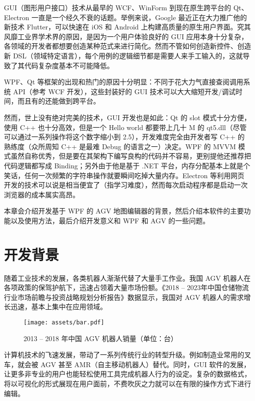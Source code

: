 
GUI（图形用户接口）技术从最早的 WCF、WinForm 到现在原生跨平台的 Qt、Electron 一直是一个经久不衰的话题。举例来说，Google 最近正在大力推广他的新技术 Flutter，可以快速在 iOS 和 Android 上构建高质量的原生用户界面。究其风靡工业界学术界的原因，是因为一个用户体验良好的 GUI 应用本身十分复杂，各领域的开发者都想要创造某种范式\cite{url:uiArchs}来进行简化。然而不管如何创造新控件、创造新 DSL（领域特定语言），每个用例的逻辑细节都是需要人来手工输入的，这就导致了其代码复杂度基本不可能降低。

WPF、Qt 等框架的出现和热门的原因十分明显：不同于花大力气直接查阅调用系统 API（参考 WCF 开发），这些封装好的 GUI 技术可以大大缩短开发/调试时间，而且有的还能做到跨平台。

然而，世上没有绝对完美的技术，GUI 开发也是如此：Qt 的 slot 模式十分方便，使用 C++ 也十分高效，但是一个 Hello world 都要带上几十 M 的 qt5.dll（尽管可以通过一系列操作将这个数字缩小到 2.5），开发难度完全由开发者写 C++ 的熟练度（众所周知 C++ 是最难 Debug 的语言之一）决定。WPF 的 MVVM 模式虽然自称优秀，但是要在其架构下编写良构的代码并不容易，更别提他还推荐把代码逻辑都写成 Binding；另外由于他是基于 .NET 平台，内存分配基本上就是个笑话，任何一次频繁的字符串操作就要瞬间吃掉大量内存。Electron 等利用网页开发的技术可以说是相当便宜了（指学习难度），然而每次启动程序都是启动一次浏览器的成本属实高昂。

本章会介绍开发基于 WPF 的 AGV 地图编辑器的背景，然后介绍本软件的主要功能以及使用方法，最后介绍开发意义和 WPF 和 AGV 的一些问题。

\section{开发背景}

随着工业技术的发展，各类机器人渐渐代替了大量手工作业。我国 AGV 机器人在各项政策的保驾护航下，迅速占领着大量市场份额。《2018 -- 2023年中国仓储物流行业市场前瞻与投资战略规划分析报告》数据\cite{url:20180131C02LR0}显示，我国对 AGV 机器人的需求增长迅速，基本上集中在应用领域。

\begin{figure}[H]
  \centering
  \texttt{[image: assets/bar.pdf]}
  \caption{2013 -- 2018 年中国 AGV 机器人销量（单位：台）}
  \label{fig:bar}
\end{figure}

计算机技术的飞速发展，带动了一系列传统行业的转型升级。例如制造业常用的叉车，就会被 AGV 甚至 AMR（自主移动机器人）替代。同时，GUI 软件的发展，让更多非专业的用户也能轻松使用工具完成机器人行为的设定。复杂的数据格式，将以可视化的形式展现在用户面前，不费吹灰之力就可以在有限的操作方式下进行编辑。


